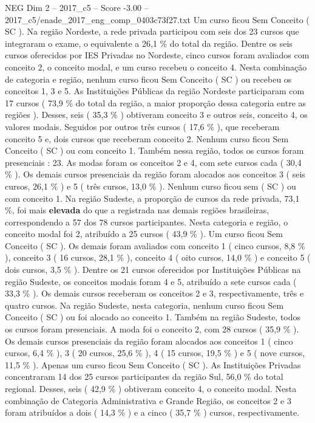 \begin{textsample}{NEG Dim 2 – 2017\_c5 – Score -3.00 – 2017\_c5/enade\_2017\_eng\_comp\_0403c73f27.txt}
Um curso ficou Sem Conceito ( SC ).
Na região Nordeste, a rede privada participou com seis dos 23 cursos que integraram o exame, o equivalente a 26,1 \% do total da região.
Dentre os seis cursos oferecidos por IES Privadas no Nordeste, cinco cursos foram avaliados com conceito 2, o conceito modal, e um curso recebeu o conceito 4.
Nesta combinação de categoria e região, nenhum curso ficou Sem Conceito ( SC ) ou recebeu os conceitos 1, 3 e 5.
As Instituições Públicas da região Nordeste participaram com 17 cursos ( 73,9 \% do total da região, a maior proporção dessa categoria entre as regiões ).
Desses, seis ( 35,3 \% ) obtiveram conceito 3 e outros seis, conceito 4, os valores modais.
Seguidos por outros três cursos ( 17,6 \% ), que receberam conceito 5 e, dois cursos que receberam conceito 2.
Nenhum curso ficou Sem Conceito ( SC ) ou com conceito 1.
Também nessa região, todos os cursos foram presenciais : 23.
As modas foram os conceitos 2 e 4, com sete cursos cada ( 30,4 \% ).
Os demais cursos presenciais da região foram alocados aos conceitos 3 ( seis cursos, 26,1 \% ) e 5 ( três cursos, 13,0 \% ).
Nenhum curso ficou sem ( SC ) ou com conceito 1.
Na região Sudeste, a proporção de cursos da rede privada, 73,1 \%, foi mais \textbf{elevada} do que a registrada nas demais regiões brasileiras, correspondendo a 57 dos 78 cursos participantes.
Nesta categoria e região, o conceito modal foi 2, atribuído a 25 cursos ( 43,9 \% ).
Um curso ficou Sem Conceito ( SC ).
Os demais foram avaliados com conceito 1 ( cinco cursos, 8,8 \% ), conceito 3 ( 16 cursos, 28,1 \% ), conceito 4 ( oito cursos, 14,0 \% ) e conceito 5 ( dois cursos, 3,5 \% ).
Dentre os 21 cursos oferecidos por Instituições Públicas na região Sudeste, os conceitos modais foram 4 e 5, atribuído a sete cursos cada ( 33,3 \% ).
Os demais cursos receberam os conceitos 2 e 3, respectivamente, três e quatro cursos.
Na região Sudeste, nesta categoria, nenhum curso ficou Sem Conceito ( SC ) ou foi alocado ao conceito 1.
Também na região Sudeste, todos os cursos foram presenciais.
A moda foi o conceito 2, com 28 cursos ( 35,9 \% ).
Os demais cursos presenciais da região foram alocados aos conceitos 1 ( cinco cursos, 6,4 \% ), 3 ( 20 cursos, 25,6 \% ), 4 ( 15 cursos, 19,5 \% ) e 5 ( nove cursos, 11,5 \% ).
Apenas um curso ficou Sem Conceito ( SC ).
As Instituições Privadas concentraram 14 dos 25 cursos participantes da região Sul, 56,0 \% do total regional.
Desses, seis ( 42,9 \% ) obtiveram conceito 4, o conceito modal.
Nesta combinação de Categoria Administrativa e Grande Região, os conceitos 2 e 3 foram atribuídos a dois ( 14,3 \% ) e a cinco ( 35,7 \% ) cursos, respectivamente.

\end{textsample}
